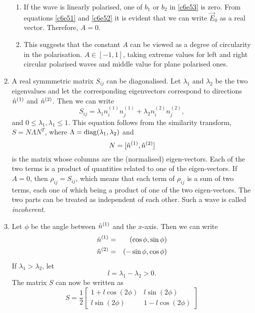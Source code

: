 \begin{enumerate}
\begin{enumerate}
\item If the wave is linearly polarised, one of $b_1$ or $b_2$ in \eqref{c6e53}
is zero. From equations \eqref{c6e51} and \eqref{c6e52} it is evident that we 
can write $\vec{E}_0$ as a real vector. Therefore, $A = 0$.

\item This suggests that the constant $A$ can be viewed as a degree of 
circularity in the polarisation. $A \in [-1, 1]$, taking extreme values for 
left and right circular polarised waves and middle value for plane polarised 
ones.
\end{enumerate}

\item A real symmmetric matrix $S_{ij}$ can be diagonalised. Let $\lambda_1$ and
$\lambda_2$ be the two eigenvalues and let the corresponding eigenvectors 
correspond to directions $\hat{n}^{(1)}$ and $\hat{n}^{(2)}$. Then we can write
\begin{equation}\label{c6e99}
S_{ij} = \lambda_1 n^{(1)}_in^{(1)}_j + \lambda_2 n^{(2)}_in^{(2)}_j,
\end{equation}
and $0 \le \lambda_1, \lambda_1 \le 1$. This equation follows from the 
similarity transform, $S = N\Lambda N^T$, where $\Lambda = \operatorname{diag}(\lambda_1,
\lambda_2)$ and 
\[
N = [\hat{n}^{(1)}, \hat{n}^{(2)}]
\]
is the matrix whose columns are the (normalised) eigen-vectors. Each of the 
two terms is a product of quantities related to one of the eigen-vectors. If
$A = 0$, then $\rho_{ij} = S_{ij}$, which means that each term of $\rho_{ij}$ 
is a sum of two terms, each one of which being a product of one of the two 
eigen-vectors. The two parts can be treated as independent of each other. Such 
a wave is called \emph{incoherent}.
\item Let $\phi$ be the angle between $\hat{n}^{(1)}$ and the $x$-axis. Then we can 
write
\begin{eqnarray}
\hat{n}^{(1)} &=& (\cos\phi, \sin\phi) \label{c6e100} \\
\hat{n}^{(2)} &=& (-\sin\phi, \cos\phi) \label{c6e101}
\end{eqnarray}
If $\lambda_1 > \lambda_2$, let
\begin{equation}\label{c6e102}
l = \lambda_1 - \lambda_2 > 0.
\end{equation}
The matrix $S$ can now be written as
\begin{equation}\label{c6e103}
S = \frac{1}{2}\begin{bmatrix}
1 + l\cos(2\phi) & l\sin(2\phi) \\
l\sin(2\phi) & 1 - l\cos(2\phi)

\end{bmatrix}
\end{equation}
\end{enumerate}
